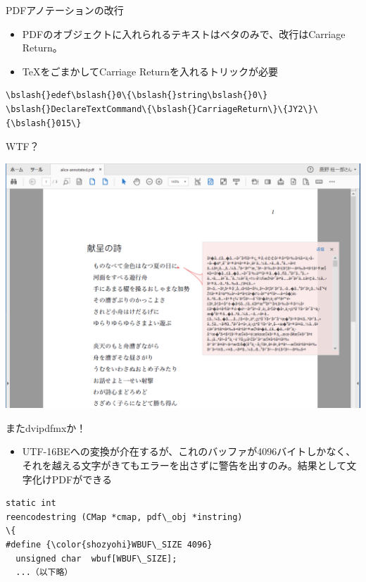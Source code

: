 \documentclass[14pt,dvipdfmx,uplatex]{beamer}
\begin{document}
\begin{frame}[fragile]{\inhibitglue PDFアノテーションの改行}
  \sffamily
  \begin{itemize}
    \item PDFのオブジェクトに入れられるテキストはベタのみで、改行はCarriage Return。
    \item TeXをごまかしてCarriage Returnを入れるトリックが必要
  \end{itemize}
  \begin{tcolorbox}
  \begin{Verbatim}[commandchars=\\\{\}, breaklines=true, breakanywhere=true]
\bslash{}edef\bslash{}0\{\bslash{}string\bslash{}0\}
\bslash{}DeclareTextCommand\{\bslash{}CarriageReturn\}\{JY2\}\{\bslash{}015\}
  \end{Verbatim}
  \end{tcolorbox}
\end{frame}

\begin{frame}[t]{\inhibitglue WTF？}
  \sffamily
  \begin{center}
    \includegraphics[width=.9\textwidth]{alice-edcom.png}
  \end{center}
\end{frame}

\begin{frame}[fragile]{\inhibitglue またdvipdfmxか！}
  \sffamily
  \begin{itemize}
    \item UTF-16BEへの変換が介在するが、これのバッファが4096バイト{\color{shozyohi}しか}なく、それを越える文字がきてもエラーを出さずに警告を出すのみ。結果として文字化けPDFができる
  \end{itemize}
  \begin{tcolorbox}
  \begin{Verbatim}[commandchars=\\\{\}, breaklines=true, breakanywhere=true]
static int
reencodestring (CMap *cmap, pdf\_obj *instring)
\{
#define {\color{shozyohi}WBUF\_SIZE 4096}
  unsigned char  wbuf[WBUF\_SIZE];
  ...（以下略）
    \end{Verbatim}
  \end{tcolorbox}
\end{frame}
\end{document}
